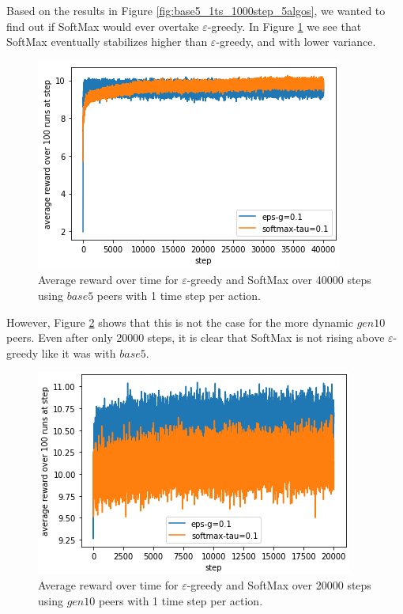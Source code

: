 \documentclass{article}
\begin{document}
Based on the results in Figure \ref{fig:base5_1ts_1000step_5algos}, we wanted to find out if SoftMax would ever overtake $\varepsilon$-greedy. In 
Figure \ref{fig:base5_1ts_40000step_eps_sm} we see that SoftMax eventually stabilizes higher than $\varepsilon$-greedy, and with lower variance.
\begin{figure}[h]
    \centering
    \includegraphics[width=1\linewidth]{figs/base5_1ts_40000step_eps-g_softmax.png}
    \caption{Average reward over time for $\varepsilon$-greedy and SoftMax over 40000 steps using $base5$ peers with 1 time step per action.}
    \label{fig:base5_1ts_40000step_eps_sm}
\end{figure}

However, Figure \ref{fig:gen10_1ts_20000step_eps_sm} shows that this is not the case for the more dynamic $gen10$ peers. Even after only 20000 steps, it is clear that 
SoftMax is not rising above $\varepsilon$-greedy like it was with $base5$. 
\begin{figure}[h]
    \centering
    \includegraphics[width=1\linewidth]{figs/gen10_1ts_20000step_eps-g_softmax.png}
    \caption{Average reward over time for $\varepsilon$-greedy and SoftMax over 20000 steps using $gen10$ peers with 1 time step per action.}
    \label{fig:gen10_1ts_20000step_eps_sm}
\end{figure}
\end{document}
